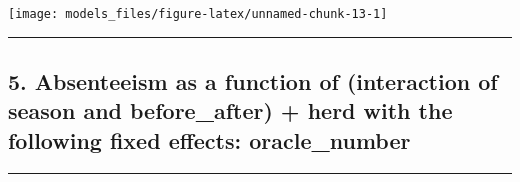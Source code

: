 \documentclass[]{article}
\begin{document}
\begin{center}\texttt{[image: models\_files/figure-latex/unnamed-chunk-13-1]} \end{center}

\newpage

\begin{center}\rule{0.5\linewidth}{\linethickness}\end{center}

\subsection{5. Absenteeism as a function of (interaction of season and
before\_after) + herd with the following fixed effects:
oracle\_number}\label{absenteeism-as-a-function-of-interaction-of-season-and-before_after-herd-with-the-following-fixed-effects-oracle_number}

\begin{center}\rule{0.5\linewidth}{\linethickness}\end{center}
\end{document}
